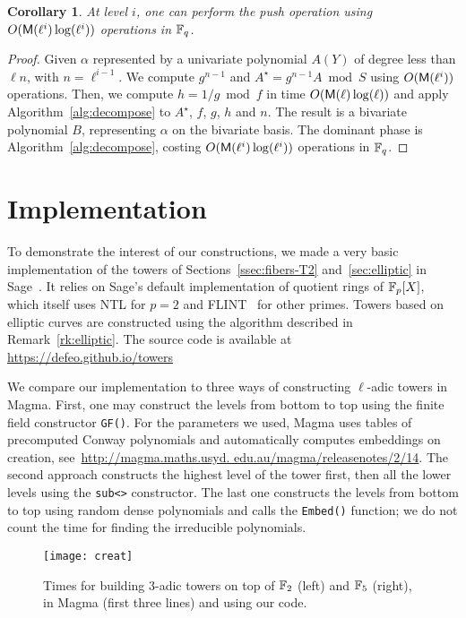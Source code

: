 \documentclass{sig-alternate}
\newtheorem{corollary}[definition]{Corollary}
\begin{document}
\begin{corollary}
  At level $i$, one can perform the push operation using
  $O(\mathsf{M}(\ell^i)\log(\ell^i))$ operations in $\mathbb{F}_q$.
\end{corollary}
\begin{proof}
  Given $\alpha$ represented by a univariate polynomial $A(Y)$ of
  degree less than $\ell n$, with $n =\ell^{i-1}$. We compute
  $g^{n-1}$ and $A^\star = g^{n-1} A \bmod S$ using $O(\mathsf{M}(\ell^i))$
  operations. Then, we compute $h=1/g \bmod f$ in time
  $O(\mathsf{M}(\ell)\log(\ell))$ and apply Algorithm~\ref{alg:decompose}
  to $A^\star$, $f$, $g$, $h$ and $n$. The result is a bivariate
  polynomial $B$, representing $\alpha$ on the bivariate basis. The
  dominant phase is Algorithm~\ref{alg:decompose}, costing
  $O(\mathsf{M}(\ell^i)\log(\ell^i))$ operations in $\mathbb{F}_q$.
\end{proof}


\section{Implementation}
\label{sec:impl}
To demonstrate the interest of our constructions, we made a very basic
implementation of the towers of Sections~\ref{ssec:fibers-T2}
and~\ref{sec:elliptic} in Sage~\cite{Sage}. It relies on Sage's
default implementation of quotient rings of $\mathbb{F}_p[X]$, which itself
uses NTL \cite{shoup2003ntl} for $p=2$ and FLINT~\cite{hart2010flint}
for other primes. Towers based on elliptic curves are constructed
using the algorithm described in Remark~\ref{rk:elliptic}. The source
code is available at \url{https://defeo.github.io/towers}

We compare our implementation to three ways of constructing
$\ell$-adic towers in Magma. First, one may construct the levels from
bottom to top using the finite field constructor \verb+GF()+. For the
parameters we used, Magma uses tables of precomputed
Conway polynomials and automatically computes embeddings on creation,
see~\url{http://magma.maths.usyd.
  edu.au/magma/releasenotes/2/14}. The second approach constructs the
highest level of the tower first, then all the lower levels using the
\verb+sub<>+ constructor. The last one constructs the levels from
bottom to top using random dense polynomials and calls the
\verb+Embed()+ function; we do not count the time for finding the
irreducible polynomials.


\begin{figure}
  \centering
  \texttt{[image: creat]}
  \vspace*{-6mm}
  \caption{Times for building $3$-adic towers on top of $\mathbb{F}_2$ (left)
    and $\mathbb{F}_5$ (right), in Magma (first three lines) and using our
    code.}
  \label{fig:build}
  \vspace*{-3mm}
\end{figure}
\end{document}
